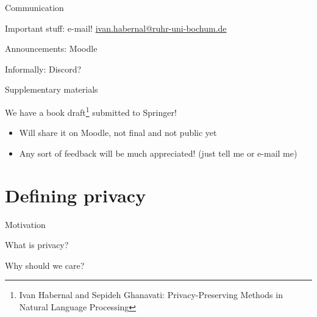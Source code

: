 \documentclass[12pt,aspectratio=169,handout]{beamer}
\begin{document}
\begin{frame}{Communication}

Important stuff: e-mail! \url{ivan.habernal@ruhr-uni-bochum.de}

Announcements: Moodle

Informally: Discord?

\end{frame}

\begin{frame}{Supplementary materials}

We have a book draft\footnote{Ivan Habernal and Sepideh Ghanavati: Privacy-Preserving Methods in Natural Language Processing} submitted to Springer!

\begin{itemize}
\item Will share it on Moodle, not final and not public yet
\item Any sort of feedback will be much appreciated! (just tell me or e-mail me)
\end{itemize}


\end{frame}


\section{Defining privacy}


\begin{frame}{Motivation}

What is privacy?

Why should we care?


	
\end{frame}
\end{document}
